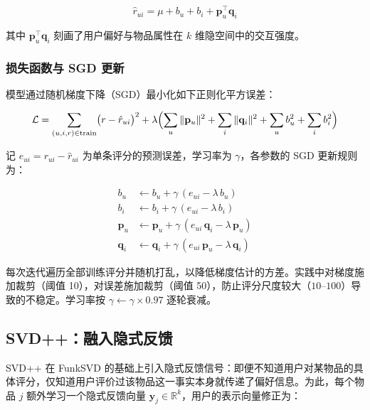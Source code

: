 \documentclass[UTF8,a4paper,10pt]{ctexart}
\begin{document}
\begin{equation}
    \hat{r}_{ui} = \mu + b_u + b_i + \mathbf{p}_u^{\!\top} \mathbf{q}_i
    \label{eq:funk}
\end{equation}

其中 $\mathbf{p}_u^{\!\top} \mathbf{q}_i$ 刻画了用户偏好与物品属性在 $k$ 维隐空间中的交互强度。

\subsubsection{损失函数与 SGD 更新}

模型通过随机梯度下降（SGD）最小化如下正则化平方误差：

\begin{equation}
    \mathcal{L} = \sum_{(u,i,r) \in \text{train}} \bigl(r - \hat{r}_{ui}\bigr)^2
                  + \lambda\Bigl(\sum_u \|\mathbf{p}_u\|^2 + \sum_i \|\mathbf{q}_i\|^2
                                + \sum_u b_u^2 + \sum_i b_i^2\Bigr)
    \label{eq:funk_loss}
\end{equation}

记 $e_{ui} = r_{ui} - \hat{r}_{ui}$ 为单条评分的预测误差，学习率为 $\gamma$，各参数的 SGD 更新规则为：

\begin{align}
    b_u &\leftarrow b_u + \gamma\,(e_{ui} - \lambda\,b_u) \label{eq:funk_sgd_bu} \\
    b_i &\leftarrow b_i + \gamma\,(e_{ui} - \lambda\,b_i) \label{eq:funk_sgd_bi} \\
    \mathbf{p}_u &\leftarrow \mathbf{p}_u + \gamma\,(e_{ui}\,\mathbf{q}_i - \lambda\,\mathbf{p}_u) \label{eq:funk_sgd_pu} \\
    \mathbf{q}_i &\leftarrow \mathbf{q}_i + \gamma\,(e_{ui}\,\mathbf{p}_u - \lambda\,\mathbf{q}_i) \label{eq:funk_sgd_qi}
\end{align}

每次迭代遍历全部训练评分并随机打乱，以降低梯度估计的方差。实践中对梯度施加裁剪（阈值 10），对误差施加裁剪（阈值 50），防止评分尺度较大（$10$--$100$）导致的不稳定。学习率按 $\gamma \leftarrow \gamma \times 0.97$ 逐轮衰减。

\subsection{SVD++：融入隐式反馈}

SVD++ 在 FunkSVD 的基础上引入隐式反馈信号：即便不知道用户对某物品的具体评分，仅知道用户评价过该物品这一事实本身就传递了偏好信息\cite{koren2008factorization}。为此，每个物品 $j$ 额外学习一个隐式反馈向量 $\mathbf{y}_j \in \mathbb{R}^k$，用户的表示向量修正为：
\end{document}
